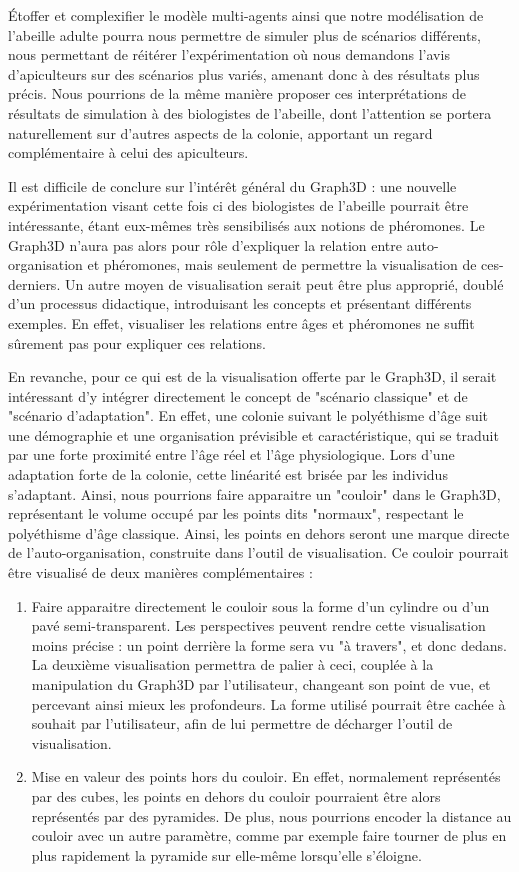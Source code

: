 	Étoffer et complexifier le modèle multi-agents ainsi que notre modélisation de l'abeille adulte pourra nous permettre de simuler plus de scénarios différents, nous permettant de réitérer l'expérimentation où nous demandons l'avis d'apiculteurs sur des scénarios plus variés, amenant donc à des résultats plus précis. Nous pourrions de la même manière proposer ces interprétations de résultats de simulation à des biologistes de l'abeille, dont l'attention se portera naturellement sur d'autres aspects de la colonie, apportant un regard complémentaire à celui des apiculteurs.

Il est difficile de conclure sur l'intérêt général du Graph3D : une nouvelle expérimentation visant cette fois ci des biologistes de l'abeille pourrait être intéressante, étant eux-mêmes très sensibilisés aux notions de phéromones. Le Graph3D n'aura pas alors pour rôle d'expliquer la relation entre auto-organisation et phéromones, mais seulement de permettre la visualisation de ces-derniers. Un autre moyen de visualisation serait peut être plus approprié, doublé d'un processus didactique, introduisant les concepts et présentant différents exemples. En effet, visualiser les relations entre âges et phéromones ne suffit sûrement pas pour expliquer ces relations.

	En revanche, pour ce qui est de la visualisation offerte par le Graph3D, il serait intéressant d'y intégrer directement le concept de "scénario classique" et de "scénario d'adaptation". En effet, une colonie suivant le polyéthisme d'âge suit une démographie et une organisation prévisible et caractéristique, qui se traduit par une forte proximité entre l'âge réel et l'âge physiologique. Lors d'une adaptation forte de la colonie, cette linéarité est brisée par les individus s'adaptant. Ainsi, nous pourrions faire apparaitre un "couloir" dans le Graph3D, représentant le volume occupé par les points dits "normaux", respectant le polyéthisme d'âge classique. Ainsi, les points en dehors seront une marque directe de l'auto-organisation, construite dans l'outil de visualisation. Ce couloir pourrait être visualisé de deux manières complémentaires :
	\begin{enumerate}
		\item Faire apparaitre directement le couloir sous la forme d'un cylindre ou d'un pavé semi-transparent. Les perspectives peuvent rendre cette visualisation moins précise : un point derrière la forme sera vu "à travers", et donc dedans. La deuxième visualisation permettra de palier à ceci, couplée à la manipulation du Graph3D par l'utilisateur, changeant son point de vue, et percevant ainsi mieux les profondeurs. La forme utilisé pourrait être cachée à souhait par l'utilisateur, afin de lui permettre de décharger l'outil de visualisation.
		\item Mise en valeur des points hors du couloir. En effet, normalement représentés par des cubes, les points en dehors du couloir pourraient être alors représentés par des pyramides. De plus, nous pourrions encoder la distance au couloir avec un autre paramètre, comme par exemple faire tourner de plus en plus rapidement la pyramide sur elle-même lorsqu'elle s'éloigne.
	\end{enumerate}
	
